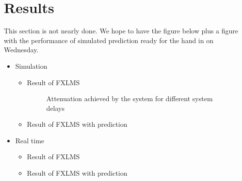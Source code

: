\section{Results}
This section is not nearly done. We hope to have the figure below plus a figure with the performance of simulated prediction ready for the hand in on Wednesday. 
\begin{itemize}
\item Simulation
\begin{itemize}
\item Result of FXLMS
\begin{figure}[H]
	\centering
	
	\caption{Attenuation achieved by the system for different system delays}
	\label{Fig:Reference to noise ratio}
\end{figure}
\item Result of FXLMS with prediction
\end{itemize}
\item Real time 
\begin{itemize}
\item Result of FXLMS
\item Result of FXLMS with prediction
\end{itemize}
\end{itemize} 

\vspace{5in}